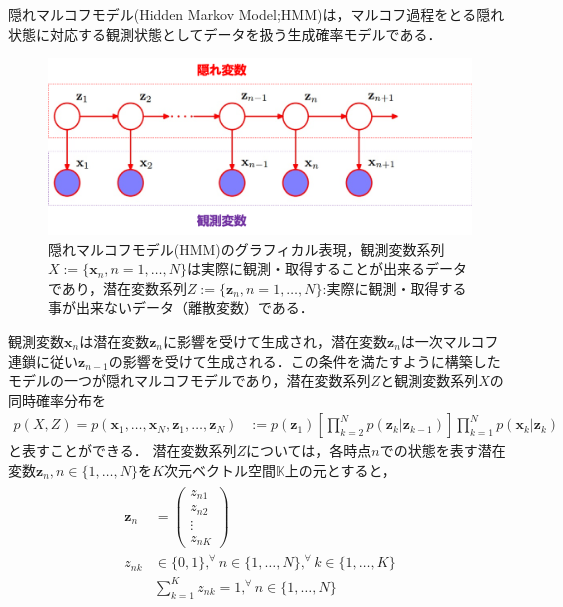 \documentclass[dvipdfmx,autodetect-engine]{jsreport}
\begin{document}
隠れマルコフモデル(Hidden Markov Model;HMM)は，マルコフ過程をとる隠れ状態に対応する観測状態としてデータを扱う生成確率モデルである\cite{元田_栗田_樋口_松本_村田201202}．
\begin{figure}[h]
\centering
\includegraphics[scale=0.5]{Picture2.png}
\caption{\label{fig:2.1}
隠れマルコフモデル(HMM)のグラフィカル表現\cite{Bishop201002}，観測変数系列$X:=\{\bm{x}_n,n=1,\dots,N\}$は実際に観測・取得することが出来るデータであり，潜在変数系列$Z:=\{\bm{z}_n,n=1,\dots,N\}$:実際に観測・取得する事が出来ないデータ（離散変数）である．}
\end{figure}
観測変数$\bm{x}_n$は潜在変数$\bm{z}_n$に影響を受けて生成され，潜在変数$\bm{z}_n$は一次マルコフ連鎖に従い$\bm{z}_{n-1}$の影響を受けて生成される．この条件を満たすように構築したモデルの一つが隠れマルコフモデルであり，潜在変数系列$Z$と観測変数系列$X$の同時確率分布を
\begin{align*}
	p(X,Z) = p(\bm{x}_1,\dots,\bm{x}_N,\bm{z}_1,\dots,\bm{z}_N) &:= p(\bm{z}_1) \left[ \prod_{k=2}^N p(\bm{z}_k|\bm{z}_{k-1})\right] \prod_{k=1}^N p(\bm{x}_k|\bm{z}_k)
	\label{eq:HMM}
\end{align*}
と表すことができる．
潜在変数系列$Z$については，各時点$n$での状態を表す潜在変数$\bm{z}_n,n \in \{1,\dots,N\}$を$K$次元ベクトル空間$\mathbb{K}$上の元とすると，
\begin{align}
    \begin{aligned}
    	\bm{z}_n &= 
	    \begin{pmatrix}
		    z_{n1} \\
		    z_{n2} \\
		    \vdots \\
		    z_{nK}
	    \end{pmatrix} \\
        z_{nk} &\in \{ 0,1 \}, ^\forall n \in \{1,\dots,N\}, ^\forall k \in \{1,\dots,K\} \\
	    & \sum_{k=1}^{K} z_{nk} = 1, ^\forall n \in \{1,\dots,N\}
    \end{aligned}
\end{align}
\end{document}
